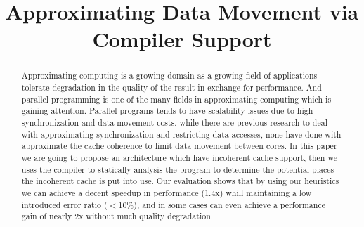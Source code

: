 \documentclass[12pt,conference]{IEEEtran}
\begin{document}
%
\title{Approximating Data Movement via Compiler Support}


\author{
\and
{}
}



\maketitle

\begin{abstract}
Approximating computing is a growing domain as a growing field of
applications tolerate degradation in the quality of the result in
exchange for performance. And parallel programming is one of the
many fields in approximating computing which is gaining attention.
Parallel programs tends to have scalability issues due to high
synchronization and data movement costs, while there are previous
research to deal with approximating synchronization and restricting
data accesses, none have done with approximate the cache coherence
to limit data movement between cores. In this paper we are going
to propose an architecture which have incoherent cache support,
then we uses the compiler to statically analysis the program to
determine the potential places the incoherent cache is put into
use. Our evaluation shows that by using our heuristics we can
achieve a decent speedup in performance (1.4x) whill maintaining
a low introduced error ratio ($<$10\%), and in some cases can even
achieve a performance gain of nearly 2x without much quality
degradation.
\end{abstract}

\end{document}
